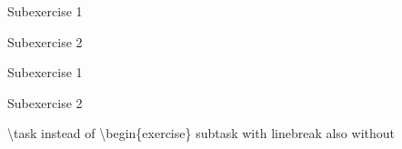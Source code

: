 \documentclass[
    11pt,
    indent=0pt,
    style=underline,
    pointtable,
    exercisepoints,
    exerciseindent=2em,
    tikz=no,
    displaydate=yes,
    exercisename=Exercise,
    worksheetname=Worksheet,
    tutorialname=Tutorial,
    groupname=Group,
]{../template/exercisesheet}
\date{3. November 1971}
\begin{document}
\begin{exercise}[4]
    \begin{subexercise}
        Subexercise 1
    \end{subexercise}
    \begin{subexercise}
        Subexercise 2
    \end{subexercise}
\end{exercise}
\begin{exercise}[6]
    \begin{subexercise}
        Subexercise 1
    \end{subexercise}
    \begin{subexercise*}
        Subexercise 2
    \end{subexercise*}
\end{exercise}

\textbackslash{}task instead of \textbackslash{}begin\{exercise\}
\subtask{} subtask with linebreak
\Subtask{} also without
\end{document}

